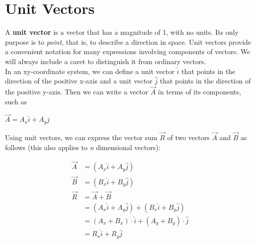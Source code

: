 \section{Unit Vectors}
A \textbf{unit vector} is a vector that has a magnitude of 1, with no units. Its only purpose is to \textit{point}, that is, to describe a direction in space. Unit vectors provide a convenient notation for many expressions involving components of vectors. We will always include a caret to distinguish it from ordinary vectors.\\
In an xy-coordinate system, we can define a unit vector $\hat{i}$ that points in the direction of the positive x-axis and a unit vector $\hat{j}$ that points in the direction of the positive y-axis. Then we can write a vector $\overrightarrow{A}$ in terms of its components, such as

\begin{center}
$\overrightarrow{A} = A_x\hat{i} + A_y\hat{j}$ 
\end{center}
\vspace{-10pt}
Using unit vectors, we can express the vector sum $\overrightarrow{R}$ of two vectors $\overrightarrow{A}$ and $\overrightarrow{B}$ as follows (this also applies to \textit{n} dimensional vectors):
\begin{mathbox}
\begin{align*}
\overrightarrow{A} &= \left(A_x \hat{i} + A_y \hat{j}\right) \\ 
\overrightarrow{B} &= \left(B_x \hat{i} + B_y \hat{j}\right) \\
\overrightarrow{R} &= \overrightarrow{A} + \overrightarrow{B} \\
&= \left(A_x\hat{i} + A_y\hat{j} \right) + \left(B_x\hat{i} + B_y\hat{j}\right) \\
&= \left(A_x + B_x\right) \cdot \hat{i} + \left(A_y + B_y\right) \cdot \hat{j} \\
&= R_x \hat{i} + R_y \hat{j}
\end{align*}
\end{mathbox}

